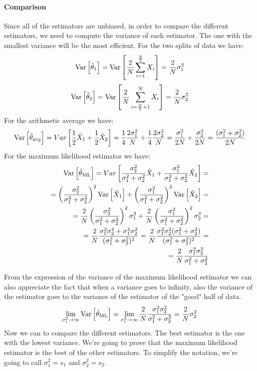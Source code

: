 \paragraph*{Comparison}
Since all of the estimators are unbiased, in order to compare the different estimators, we need to compute the variance of each estimator. The one with the smallest variance will be the most efficient. For the two splits of data we have:
\[
    \text{Var}\left[\hat \theta_1\right] = \text{Var}\left[\frac{2}{N} \sum_{i=1}^{\frac{N}{2}} X_i\right] = \frac{2}{N}\sigma_1^2
\]
\[
    \text{Var}\left[\hat \theta_2\right] = \text{Var}\left[\frac{2}{N} \sum_{i=\frac{N}{2} + 1}^{N} X_i\right] = \frac{2}{N}\sigma_2^2
\]
For the arithmetic average we have:
\[
    \text{Var}\left[\hat \theta_{\text{avg}}\right]=Var\left[\frac 12\hat X_1+\frac 12 \hat X_2\right]=\frac 14\frac{2\sigma_1^2}N+\frac 14 \frac{2\sigma_2^2}N=\frac{\sigma_1^2}{2N}+\frac{\sigma_2^2}{2N}= \frac{(\sigma_1^2+\sigma^2_2)}{2N}
\]
For the maximum likelihood estimator we have:
\begin{align*}
    \text{Var}\left[\hat{\theta}_{\text{ML}}\right] = Var\left[\frac{\sigma_2^2}{\sigma_1^2+\sigma_2^2}\hat X_1+\frac{\sigma_1^2}{\sigma_1^2+\sigma_2^2}\hat X_2\right]=                                            \\
    = \left(\frac{\sigma_2^2}{\sigma_1^2+\sigma_2^2}\right)^2 \text{Var}\left[\hat X_1\right]+\left(\frac{\sigma_1^2}{\sigma_1^2+\sigma_2^2}\right)^2 \text{Var}\left[\hat X_2\right] =                                       \\
    = \frac{2}{N} \left(\frac{\sigma_2^2}{\sigma_1^2+\sigma_2^2}\right)^2 \sigma_1^2 + \frac{2}{N} \left(\frac{\sigma_1^2}{\sigma_1^2+\sigma_2^2}\right)^2 \sigma_2^2 =                     \\
    = \frac{2}{N} \frac{\sigma_1^2\sigma_2^4+\sigma_1^4\sigma_2^2}{(\sigma_1^2+\sigma_2^2)^2} = \frac{2}{N} \frac{\sigma_1^2\sigma_2^2(\sigma_1^2+\sigma_2^2)}{(\sigma_1^2+\sigma_2^2)^2} = \\
    = \frac{2}{N} \frac{\sigma_1^2\sigma_2^2}{\sigma_1^2+\sigma_2^2}
\end{align*}

From the expression of the variance of the maximum likelihood estimator we can also appreciate the fact that when a variance goes to infinity, also the variance of the estimator goes to the variance of the estimator of the "good" half of data.
\[
    \lim_{\sigma_1^2 \to \infty} \var{\hat{\theta}_{\text{ML}}} = \lim_{\sigma_1^2 \to \infty} \frac{2}{N} \frac{\sigma_1^2\sigma_2^2}{\sigma_1^2+\sigma_2^2} = \frac{2}{N} \sigma_2^2
\]
Now we can to compare the different estimators. The best estimator is the one with the lowest variance. We're going to prove that the maximum likelihood estimator is the best of the other estimators. To simplify the notation, we're going to call $\sigma_1^2 = s_1$ and $\sigma_2^2 = s_2$.


